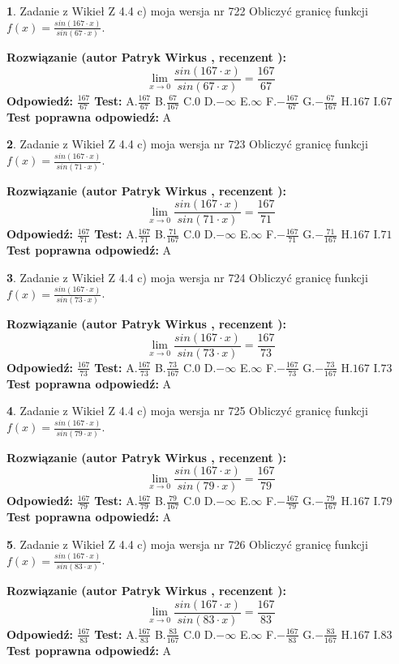 \documentclass[12pt, a4paper]{article}
\theoremstyle{definition} %
\newtheorem{zad}{}
\newcommand{\zadStart}[1]{\begin{zad}#1\newline}
\newcommand{\zadStop}{\end{zad}}
\newcommand{\rozwStart}[2]{\noindent \textbf{Rozwiązanie (autor #1 , recenzent #2): }\newline}
\newcommand{\rozwStop}{\newline}
\newcommand{\odpStart}{\noindent \textbf{Odpowiedź:}\newline}
\newcommand{\odpStop}{\newline}
\newcommand{\testStart}{\noindent \textbf{Test:}\newline}
\newcommand{\testStop}{\newline}
\newcommand{\kluczStart}{\noindent \textbf{Test poprawna odpowiedź:}\newline}
\newcommand{\kluczStop}{\newline}
\begin{document}
\zadStart{Zadanie z Wikieł Z 4.4 c) moja wersja nr 722}
Obliczyć granicę funkcji $f(x)=\frac{sin(167\cdot x)}{sin(67\cdot x)}$.
\zadStop
\rozwStart{Patryk Wirkus}{}
$$\lim\limits_{x\to 0}\frac{sin(167\cdot x)}{sin(67\cdot x)}=
\frac{167}{67}$$
\rozwStop
\odpStart
$\frac{167}{67}$
\odpStop
\testStart
A.$\frac{167}{67}$
B.$\frac{67}{167}$
C.$0$
D.$-\infty$
E.$\infty$
F.$-\frac{167}{67}$
G.$-\frac{67}{167}$
H.$167$
I.$67$
\testStop
\kluczStart
A
\kluczStop



\zadStart{Zadanie z Wikieł Z 4.4 c) moja wersja nr 723}
Obliczyć granicę funkcji $f(x)=\frac{sin(167\cdot x)}{sin(71\cdot x)}$.
\zadStop
\rozwStart{Patryk Wirkus}{}
$$\lim\limits_{x\to 0}\frac{sin(167\cdot x)}{sin(71\cdot x)}=
\frac{167}{71}$$
\rozwStop
\odpStart
$\frac{167}{71}$
\odpStop
\testStart
A.$\frac{167}{71}$
B.$\frac{71}{167}$
C.$0$
D.$-\infty$
E.$\infty$
F.$-\frac{167}{71}$
G.$-\frac{71}{167}$
H.$167$
I.$71$
\testStop
\kluczStart
A
\kluczStop



\zadStart{Zadanie z Wikieł Z 4.4 c) moja wersja nr 724}
Obliczyć granicę funkcji $f(x)=\frac{sin(167\cdot x)}{sin(73\cdot x)}$.
\zadStop
\rozwStart{Patryk Wirkus}{}
$$\lim\limits_{x\to 0}\frac{sin(167\cdot x)}{sin(73\cdot x)}=
\frac{167}{73}$$
\rozwStop
\odpStart
$\frac{167}{73}$
\odpStop
\testStart
A.$\frac{167}{73}$
B.$\frac{73}{167}$
C.$0$
D.$-\infty$
E.$\infty$
F.$-\frac{167}{73}$
G.$-\frac{73}{167}$
H.$167$
I.$73$
\testStop
\kluczStart
A
\kluczStop



\zadStart{Zadanie z Wikieł Z 4.4 c) moja wersja nr 725}
Obliczyć granicę funkcji $f(x)=\frac{sin(167\cdot x)}{sin(79\cdot x)}$.
\zadStop
\rozwStart{Patryk Wirkus}{}
$$\lim\limits_{x\to 0}\frac{sin(167\cdot x)}{sin(79\cdot x)}=
\frac{167}{79}$$
\rozwStop
\odpStart
$\frac{167}{79}$
\odpStop
\testStart
A.$\frac{167}{79}$
B.$\frac{79}{167}$
C.$0$
D.$-\infty$
E.$\infty$
F.$-\frac{167}{79}$
G.$-\frac{79}{167}$
H.$167$
I.$79$
\testStop
\kluczStart
A
\kluczStop



\zadStart{Zadanie z Wikieł Z 4.4 c) moja wersja nr 726}
Obliczyć granicę funkcji $f(x)=\frac{sin(167\cdot x)}{sin(83\cdot x)}$.
\zadStop
\rozwStart{Patryk Wirkus}{}
$$\lim\limits_{x\to 0}\frac{sin(167\cdot x)}{sin(83\cdot x)}=
\frac{167}{83}$$
\rozwStop
\odpStart
$\frac{167}{83}$
\odpStop
\testStart
A.$\frac{167}{83}$
B.$\frac{83}{167}$
C.$0$
D.$-\infty$
E.$\infty$
F.$-\frac{167}{83}$
G.$-\frac{83}{167}$
H.$167$
I.$83$
\testStop
\kluczStart
A
\kluczStop
\end{document}
